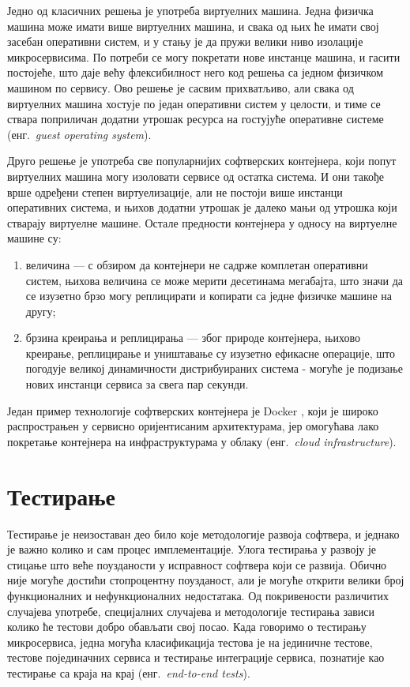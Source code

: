 \documentclass[12pt,oneside]{memoir}
\begin{document}
Једно од класичних решења је употреба виртуелних машина. Једна физичка машина може имати више виртуелних машина, и свака од њих ће имати свој засебан оперативни систем, и у стању је да пружи велики ниво изолације микросервисима. По потреби се могу покретати нове инстанце машина, и гасити постојеће, што даје већу флексибилност него код решења са једном физичком машином по сервису. Ово решење је сасвим прихватљиво, али свака од виртуелних машина хостује по један оперативни систем у целости, и тиме се ствара поприличан додатни утрошак ресурса на гостујуће оперативне системе (енг.~\textit{guest operating system}).

Друго решење је употреба све популарнијих софтверских контејнера, који попут виртуелних машина могу изоловати сервисе од остатка система. И они такође врше одређени степен виртуелизације, али не постоји више инстанци оперативних система, и њихов додатни утрошак је далеко мањи од утрошка који стварају виртуелне машине. Остале предности контејнера у односу на виртуелне машине су:
\begin{enumerate}
\item величина --- с обзиром да контејнери не садрже комплетан оперативни систем, њихова величина се може мерити десетинама мегабајта, што значи да се изузетно брзо могу реплицирати и копирати са једне физичке машине на другу;
\item брзина креирања и реплицирања --- због природе контејнера, њихово креирање, реплицирање и уништавање су изузетно ефикасне операције, што погодује великој динамичности дистрибуираних система - могуће је подизање нових инстанци сервиса за свега пар секунди.
\end{enumerate}
Један пример технологије софтверских контејнера је Docker \cite{Docker}, који је широко распрострањен у сервисно оријентисаним архитектурама, јер омогућава лако покретање контејнера на инфраструктурама у облаку (енг.~\textit{cloud infrastructure}).

\section{Тестирање}
Тестирање је неизоставан део било које методологије развоја софтвера, и једнако је важно колико и сам процес имплементације. Улога тестирања у развоју је стицање што веће поузданости у исправност софтвера који се развија. Обично није могуће достићи стопроцентну поузданост, али је могуће открити велики број функционалних и нефункционалних недостатака. Од покривености различитих случајева употребе, специјалних случајева и методологије тестирања зависи колико ће тестови добро обављати свој посао. Када говоримо о тестирању микросервиса, једна могућа класификација тестова је на јединичне тестове, тестове појединачних сервиса и тестирање интеграције сервиса, познатије као тестирање са краја на крај (енг.~\textit{end-to-end tests}).
\end{document}
